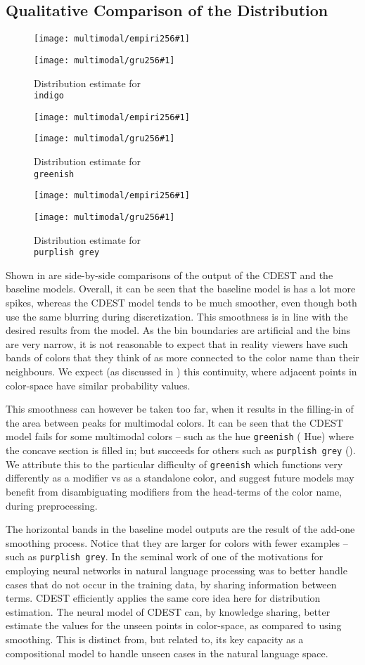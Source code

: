 \documentclass[11pt,a4paper]{article}
\newcommand{\textcite}{\citet}
\begin{document}
\subsection{Qualitative Comparison of the Distribution}\label{resultsdistributions}

\newcommand{\multimodalfig}[2]{
	\begin{figure}
		\texttt{[image: multimodal/empiri256\#1]}
		
		\vspace{3mm}
		
		\texttt{[image: multimodal/gru256\#1]}	
		\caption{\label{fig#1} Distribution estimate for \\ \mbox{\texttt{#2}}}
	\end{figure}
}

\multimodalfig{indigo}{indigo}
\multimodalfig{greenish}{greenish}
\multimodalfig{purplishgrey}{purplish grey}


Shown in  are side-by-side comparisons of the output of the CDEST and the baseline models.
Overall, it can be seen that the baseline model is has a lot more spikes,
whereas the CDEST model tends to be much smoother, even though both use the same blurring during discretization.
This smoothness is in line with the desired results from the model.
As the bin boundaries are artificial and the bins are very narrow, it is not reasonable to expect that in reality viewers have such bands of colors that they think of as more connected to the color name than their neighbours.
We expect  (as discussed in ) this continuity, where adjacent points in color-space have similar probability values.

This smoothness can however be taken too far, when it results in the filling-in of the area between peaks for multimodal colors.
It can be seen that the CDEST model fails for some multimodal colors -- such as the hue \texttt{greenish} ( Hue) where the concave section is filled in;
but succeeds for others such as \texttt{purplish grey} ().
We attribute this to the particular difficulty of \texttt{greenish} which functions very differently as a modifier vs as a standalone color, and suggest future models may benefit from disambiguating modifiers from the head-terms of the color name, during preprocessing.


The horizontal bands in the baseline model outputs are the result of the add-one smoothing process.
Notice that they are larger for colors with fewer examples -- such as \texttt{purplish grey}.
In the seminal work of \textcite{NPLM} one of the motivations for employing neural networks in natural language processing was to better handle cases that do not occur in the training data, by sharing information between terms.
CDEST efficiently applies the same core idea here for distribution estimation.
The neural model of CDEST can, by knowledge sharing, better estimate the values for the unseen points in color-space, as compared to using smoothing.
This is distinct from, but related to, its key capacity as a compositional model to handle unseen cases in the natural language space. 
\end{document}
